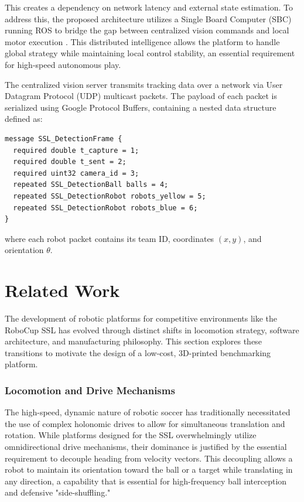 \documentclass[a4paper,twoside,12pt]{report}
\begin{document}
This creates a dependency on network latency and external state estimation. To address this, the proposed architecture utilizes a Single Board Computer (SBC) running ROS to bridge the gap between centralized vision commands and local motor execution \citep{smit2011development,joseph2018robot}. This distributed intelligence allows the platform to handle global strategy while maintaining local control stability, an essential requirement for high-speed autonomous play.

The centralized vision server transmits tracking data over a network via User Datagram Protocol (UDP) multicast packets. The payload of each packet is serialized using Google Protocol Buffers, containing a nested data structure defined as:
\begin{verbatim}
message SSL_DetectionFrame {
  required double t_capture = 1;
  required double t_sent = 2;
  required uint32 camera_id = 3;
  repeated SSL_DetectionBall balls = 4;
  repeated SSL_DetectionRobot robots_yellow = 5;
  repeated SSL_DetectionRobot robots_blue = 6;
}
\end{verbatim}
where each robot packet contains its team ID, coordinates $(x, y)$, and orientation $\theta$.

\chapter{Related Work}\label{chapter: related}
The development of robotic platforms for competitive environments like the RoboCup SSL has evolved through distinct shifts in locomotion strategy, software architecture, and manufacturing philosophy. This section explores these transitions to motivate the design of a low-cost, 3D-printed benchmarking platform.

\subsection{Locomotion and Drive Mechanisms}

The high-speed, dynamic nature of robotic soccer has traditionally necessitated the use of complex holonomic drives to allow for simultaneous translation and rotation. While platforms designed for the SSL overwhelmingly utilize omnidirectional drive mechanisms, their dominance is justified by the essential requirement to decouple heading from velocity vectors. This decoupling allows a robot to maintain its orientation toward the ball or a target while translating in any direction, a capability that is essential for high-frequency ball interception and defensive "side-shuffling."
\end{document}
